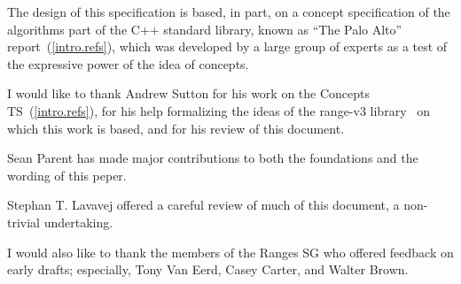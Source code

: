 
\pnum
The design of this specification is based, in part, on a concept
specification of the algorithms part of the C++ standard library, known
as ``The Palo Alto'' report~(\ref{intro.refs}), which was developed by a large
group of experts as a test of the expressive power of the idea of
concepts.

\pnum
I would like to thank Andrew Sutton for his work on the Concepts TS~(\ref{intro.refs}),
for his help formalizing the ideas of the range-v3 library~\cite{range-v3} on which this
work is based, and for his review of this document.

\pnum
Sean Parent has made major contributions to both the foundations and the wording of this
peper.

\pnum
Stephan T. Lavavej offered a careful review of much of this document, a non-trivial undertaking.

\pnum
I would also like to thank the members of the Ranges SG who offered feedback on early drafts;
especially, Tony Van Eerd, Casey Carter, and Walter Brown.
